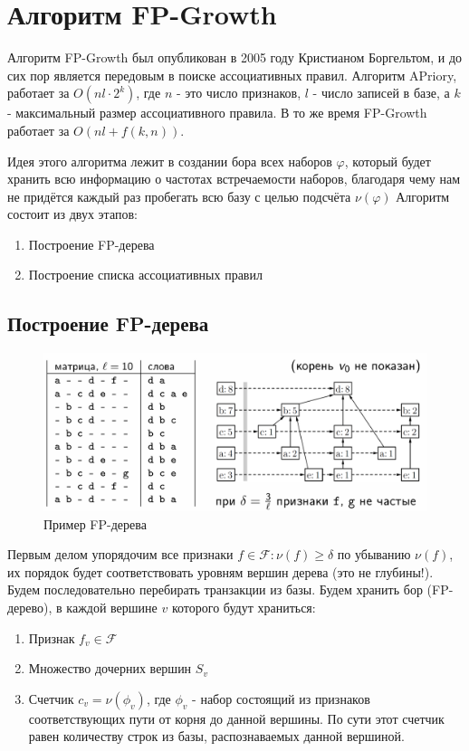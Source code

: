 \section{Алгоритм FP-Growth}
Алгоритм FP-Growth был опубликован в 2005 году Кристианом Боргельтом, и до сих пор является передовым в поиске ассоциативных правил. Алгоритм APriory, работает за $O(nl\cdot 2^k)$, где $n$ - это число признаков, $l$ - число записей в базе, а $k$ - максимальный размер ассоциативного правила. В то же время FP-Growth работает за $O(nl + f(k, n))$.

Идея этого алгоритма лежит в создании бора всех наборов $\varphi$, который будет хранить всю информацию о частотах встречаемости наборов, благодаря чему нам не придётся каждый раз пробегать всю базу с целью подсчёта $\nu(\varphi)$
\newline\newline
Алгоритм состоит из двух этапов:
\begin{enumerate}
    \item Построение FP-дерева
    \item Построение списка ассоциативных правил
\end{enumerate}

\subsection{Построение FP-дерева}

\begin{figure}[h]
    \centering
    \includegraphics[width=0.8\linewidth]{chapters/rules/images/fp-tree-example.png}
    \caption{Пример FP-дерева}
\end{figure}

Первым делом упорядочим все признаки $f \in \mathcal{F}: \nu(f) \geq \delta$ по убыванию $\nu(f)$, их порядок будет соответствовать уровням вершин дерева (это не глубины!). Будем последовательно перебирать транзакции из базы. Будем хранить бор (FP-дерево), в каждой вершине $v$ которого будут храниться: 
\begin{enumerate}
    \item Признак $f_v \in \mathcal{F}$
    \item Множество дочерних вершин $S_v$
    \item Счетчик $c_v = \nu(\phi_v)$, где $\phi_v$ - набор состоящий из признаков соответствующих пути от корня до данной вершины. По сути этот счетчик равен количеству строк из базы, распознаваемых данной вершиной.
\end{enumerate}

